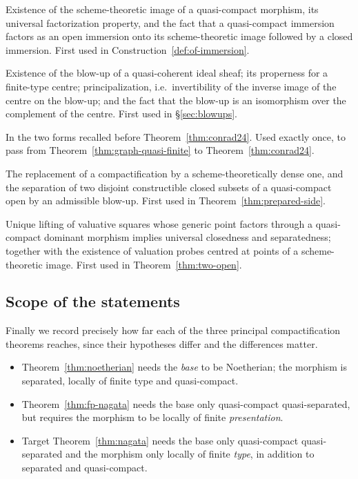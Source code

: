 \documentclass[11pt,a4paper]{article}
\theoremstyle{plain}
\theoremstyle{definition}
\theoremstyle{remark}
\newcommand{\qcqs}{quasi-compact quasi-separated}
\begin{document}
\begin{description}[leftmargin=3.2em,style=nextline,itemsep=3pt]
\item[E1. Scheme-theoretic images.]
  Existence of the scheme-theoretic image of a quasi-compact morphism, its
  universal factorization property, and the fact that a quasi-compact immersion
  factors as an open immersion onto its scheme-theoretic image followed by a
  closed immersion. First used in Construction~\ref{def:of-immersion}.
\item[E2. Blow-ups.]
  Existence of the blow-up of a quasi-coherent ideal sheaf; its properness for a
  finite-type centre; principalization, i.e.\ invertibility of the inverse image
  of the centre on the blow-up; and the fact that the blow-up is an isomorphism
  over the complement of the centre. First used in \S\ref{sec:blowups}.
\item[E3. Zariski's Main Theorem.]
  In the two forms recalled before Theorem~\ref{thm:conrad24}. Used exactly
  once, to pass from Theorem~\ref{thm:graph-quasi-finite} to
  Theorem~\ref{thm:conrad24}.
\item[E4. Dense compactifications and boundary separation.]
  The replacement of a compactification by a scheme-theoretically dense one, and
  the separation of two disjoint constructible closed subsets of a quasi-compact
  open by an admissible blow-up. First used in Theorem~\ref{thm:prepared-side}.
\item[E5. The dense-source valuative criterion.]
  Unique lifting of valuative squares whose generic point factors through a
  quasi-compact dominant morphism implies universal closedness and
  separatedness; together with the existence of valuation probes centred at
  points of a scheme-theoretic image. First used in
  Theorem~\ref{thm:two-open}.
\end{description}

\subsection{Scope of the statements}

Finally we record precisely how far each of the three principal compactification
theorems reaches, since their hypotheses differ and the differences matter.

\begin{itemize}[itemsep=2pt]
\item Theorem~\ref{thm:noetherian} needs the \emph{base} to be Noetherian; the
      morphism is separated, locally of finite type and quasi-compact.
\item Theorem~\ref{thm:fp-nagata} needs the base only \qcqs{}, but requires the
      morphism to be locally of finite \emph{presentation}.
\item Target Theorem~\ref{thm:nagata} needs the base only \qcqs{} and the
      morphism only locally of finite \emph{type}, in addition to separated and
      quasi-compact.
\end{itemize}
\end{document}
